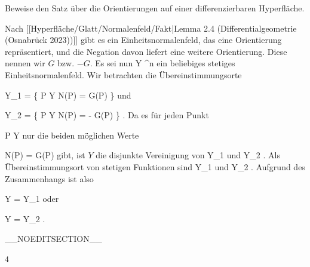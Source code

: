 {

Beweise den Satz über die Orientierungen auf einer differenzierbaren Hyperfläche.

}
{

Nach
[[Hyperfläche/Glatt/Normalenfeld/Fakt|Lemma 2.4 (Differentialgeometrie (Osnabrück 2023))]]
gibt es ein Einheitsnormalenfeld, das eine Orientierung repräsentiert, und die Negation davon liefert eine weitere Orientierung. Diese nennen wir $G$ bzw. $-G$. Es sei nun
 { Y } { \R^n
} {}
ein beliebiges stetiges Einheitsnormalenfeld. Wir betrachten die Übereinstimmungsorte

\mavergleichskettedisp
{\vergleichskette
{ Y_1
}
{ =} { \left\{ P \in Y  \mid   N(P) = G(P)         \right\}
}
{ } {
}
{ } {
}
{ } {
}
}
{}{}{}
und

\mavergleichskettedisp
{\vergleichskette
{ Y_2
}
{ =} { \left\{ P \in Y  \mid   N(P) = - G(P)         \right\}
}
{ } {
}
{ } {
}
{ } {
}
}
{}{}{.}
Da es für jeden Punkt

\mavergleichskette
{\vergleichskette
{ P
}
{ \in }{ Y
}
{  }{
}
{    }{
}
{   }{
}
}
{}{}{}
nur die beiden möglichen Werte

\mavergleichskettedisp
{\vergleichskette
{ N(P)
}
{ =} { \pm G(P)
}
{ } {
}
{ } {
}
{ } {
}
}
{}{}{}
gibt, ist $Y$ die disjunkte Vereinigung von
\mathkor {} {Y_1} {und} {Y_2} {.}
Als Übereinstimmungsort von stetigen Funktionen sind
\mathkor {} {Y_1} {und} {Y_2} {}
 {} {.}
Aufgrund des Zusammenhangs ist also

\mavergleichskette
{\vergleichskette
{ Y
}
{ = }{ Y_1
}
{  }{
}
{    }{
}
{   }{
}
}
{}{}{}
oder

\mavergleichskette
{\vergleichskette
{ Y
}
{ = }{ Y_2
}
{  }{
}
{    }{
}
{   }{
}
}
{}{}{.}

 }

__NOEDITSECTION__

{4}

